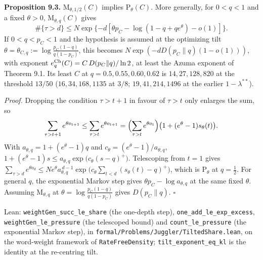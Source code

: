 \documentclass[11pt,a4paper]{article}
\begin{document}
\textbf{Proposition 9.3.} \(\mathrm M_{\theta,1/2}(C)\) implies
\(\mathrm P_\theta(C)\). More generally, for \(0<q<1\) and a fixed
\(\theta>0\), \(\mathrm M_{\theta,q}(C)\) gives \[
\#\{\tau>d\}\le
N\exp\{-d[\theta p_C-\log(1-q+qe^\theta)-o(1)]\}.
\] If \(0<q<p_C<1\) and the hypothesis is assumed at the optimizing tilt
\(\theta=\theta_{C,q}:=\log\frac{p_C(1-q)}{q(1-p_C)}\), this becomes
\(N\exp(-dD(p_C\|q)(1-o(1)))\), with exponent
\(e_q^{\rm Ch}(C)=C\,D(p_C\|q)/\ln 2\), at least the Azuma exponent of
Theorem 9.1. Its least \(C\) at \(q=0.5,0.55,0.60,0.62\) is
\(14,27,128,820\) at the threshold \(13/50\) (\(16,34,168,1135\) at
\(3/8\); \(19,41,214,1496\) at the earlier \(1-\lambda^{**}\)).

\emph{Proof.} Dropping the condition \(\tau>t+1\) in favour of
\(\tau>t\) only enlarges the sum, so \[
\sum_{\tau>t+1}e^{\theta o_{t+1}}\le\sum_{\tau>t}e^{\theta o_{t+1}}
=\Bigl(\sum_{\tau>t}e^{\theta o_t}\Bigr)\bigl(1+(e^{\theta}-1)s_\theta(t)\bigr).
\] With \(a_{\theta,q}=1+(e^\theta-1)q\) and
\(c_\theta=(e^\theta-1)/a_{\theta,q}\),
\(1+(e^\theta-1)s\le a_{\theta,q}\exp\bigl(c_\theta(s-q)^+\bigr)\).
Telescoping from \(t=1\) gives
\(\sum_{\tau>d}e^{\theta o_d}\le Ne^{\theta}a_{\theta,q}^{\,d-1}\exp\bigl(c_\theta\sum_{t<d}(s_\theta(t)-q)^+\bigr)\),
which is \(\mathrm P_\theta\) at \(q=\tfrac12\). For general \(q\), the
exponential Markov step gives \(\theta p_C-\log a_{\theta,q}\) at the
same fixed \(\theta\). Assuming \(\mathrm M_{\theta,q}\) at
\(\theta=\log\frac{p_C(1-q)}{q(1-p_C)}\) gives \(D(p_C\|q)\).
\(\square\)

Lean: \texttt{\nolinkurl{weightGen_succ_le_share}} (the one-depth step),
\texttt{\nolinkurl{one_add_le_exp_excess}},
\texttt{\nolinkurl{weightGen_le_pressure}} (the telescoped bound) and
\texttt{\nolinkurl{count_le_pressure}} (the exponential Markov step), in
\texttt{\nolinkurl{formal/Problems/Juggler/TiltedShare.lean}}, on the
word-weight framework of \texttt{\nolinkurl{RateFreeDensity}};
\texttt{\nolinkurl{tilt_exponent_eq_kl}} is the identity at the
re-centring tilt.
\end{document}
